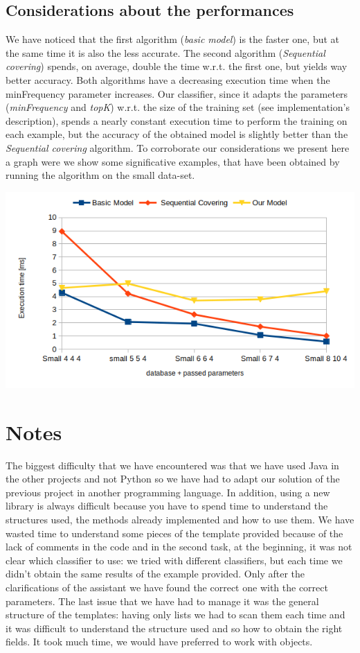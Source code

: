 \documentclass[11pt, a4paper]{article}
\begin{document}
	\subsection{Considerations about the performances}
		We have noticed that the first algorithm (\textit{basic model}) is the faster one, but at the same time it is also the less accurate. The second algorithm (\textit{Sequential covering}) spends, on average, double the time w.r.t. the first one, but yields way better accuracy. Both algorithms have a decreasing execution time when the minFrequency parameter increases.
		Our classifier, since it adapts the parameters (\textit{minFrequency} and \textit{topK}) w.r.t. the size of the training set (see implementation's description), spends a nearly constant execution time to perform the training on each example, but the accuracy of the obtained model is slightly better than the \textit{Sequential covering} algorithm.
		To corroborate our considerations we present here a graph were we show some significative examples, that have been obtained by running the algorithm on the small data-set.
		\begin{center}
			\includegraphics[scale =0.7]{graph.png}
		\end{center}
		
	
	\section{Notes}
	The biggest difficulty that we have encountered was that we have used Java in the other projects and not Python so we have had to adapt our solution of the previous project in another programming language. In addition, using a new library is always difficult because you have to spend time to understand the structures used, the methods already implemented and how to use them. \newline
	We have wasted time to understand some pieces of the template provided because of the lack of comments in the code and in the second task, at the beginning, it was not clear which classifier to use: we tried with different classifiers, but each time we didn't obtain the same results of the example provided. Only after the clarifications of the assistant we have found the correct one with the correct parameters. \newline
	The last issue that we have had to manage it was the general structure of the templates: having only lists we had to scan them each time and it was difficult to understand the structure used and so how to obtain the right fields. It took much time, we would have preferred to work with objects.    
		
\end{document}
